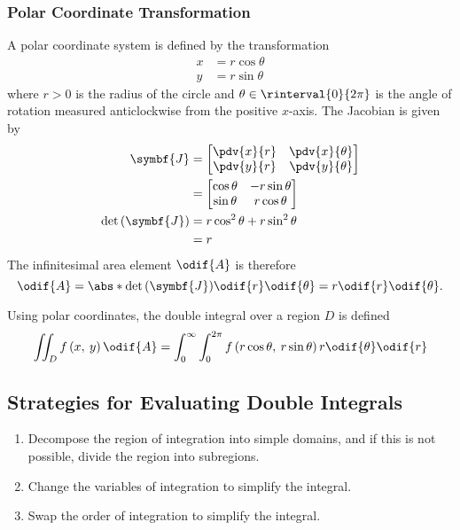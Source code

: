 \documentclass{article}
\begin{document}
\subsubsection{Polar Coordinate Transformation}
\begin{definition}
    A polar coordinate system is defined by the transformation
    \begin{align*}
        x & = r \cos{\theta} \\
        y & = r \sin{\theta}
    \end{align*}
    where \(r > 0\) is the radius of the circle and \(\theta \in \rinterval{0}{2\pi}\)
    is the angle of rotation measured anticlockwise from the positive
    \(x\)-axis.
    The Jacobian is given by
    \begin{align*}
        \symbf{J}                      & =
        \begin{bmatrix}
            \displaystyle\pdv{x}{r} & \displaystyle\pdv{x}{\theta} \\
            \displaystyle\pdv{y}{r} & \displaystyle\pdv{y}{\theta} \\
        \end{bmatrix}
        \\
                                       & =
        \begin{bmatrix}
            \cos{\theta} & -r \sin{\theta} \\
            \sin{\theta} & r \cos{\theta}  \\
        \end{bmatrix}
        \\
        \det{\left( \symbf{J} \right)} & = r \cos^2{\theta} + r \sin^2{\theta} \\
                                       & = r
    \end{align*}
    The infinitesimal area element \(\odif{A}\) is therefore
    \begin{equation*}
        \odif{A} = \abs*{\det{\left( \symbf{J} \right)}} \odif{r}\odif{\theta} = r \odif{r}\odif{\theta}.
    \end{equation*}
\end{definition}
Using polar coordinates, the double integral over a region \(D\) is
defined
\begin{equation*}
    \iint_D f\left( x,\: y \right) \odif{A} = \int_0^\infty \int_0^{2\pi} f\left( r \cos{\theta},\: r \sin{\theta} \right) r \odif{\theta} \odif{r}
\end{equation*}
\subsection{Strategies for Evaluating Double Integrals}
\begin{enumerate}
    \item Decompose the region of integration into simple domains, and
          if this is not possible, divide the region into subregions.
    \item Change the variables of integration to simplify the integral.
    \item Swap the order of integration to simplify the integral.
\end{enumerate}
\end{document}
